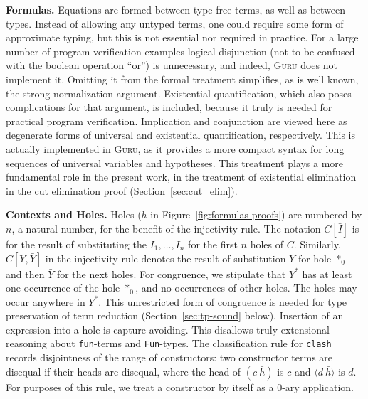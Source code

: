 \documentclass{fundam}
\begin{document}
\textbf{Formulas.} Equations are formed between type-free terms, as
well as between types.  Instead of allowing any untyped terms, one
could require some form of approximate typing, but this is not
essential nor required in practice.  For a large number of program
verification examples logical disjunction (not to be confused with the
boolean operation ``or'') is unnecessary, and indeed, \textsc{Guru}
does not implement it.  Omitting it from the formal treatment
simplifies, as is well known, the strong normalization argument.
Existential quantification, which also poses complications for that
argument, is included, because it truly is needed for practical
program verification.  Implication and conjunction are viewed here as
degenerate forms of universal and existential quantification,
respectively.  This is actually implemented in \textsc{Guru}, as it
provides a more compact syntax for long sequences of universal
variables and hypotheses.  This treatment plays a more fundamental
role in the present work, in the treatment of existential elimination
in the cut elimination proof (Section~\ref{sec:cut_elim}).

\textbf{Contexts and Holes.}  Holes ($h$ in
Figure~\ref{fig:formulas-proofs}) are numbered by $n$, a natural
number, for the benefit of the injectivity rule.  The notation
$C[\bar{I}]$ is for the result of substituting the $I_1,\ldots,I_n$
for the first $n$ holes of $C$.  Similarly, $C[Y,\bar{Y}]$ in the
injectivity rule denotes the result of substitution $Y$ for hole $*_0$
and then $\bar{Y}$ for the next holes.  For congruence, we stipulate
that $Y^*$ has at least one occurrence of the hole $*_0$, and no
occurrences of other holes.  The holes may occur anywhere in $Y^*$.
This unrestricted form of congruence is needed for type preservation
of term reduction (Section~\ref{sec:tp-sound} below). Insertion of an
expression into a hole is capture-avoiding.  This disallows truly
extensional reasoning about \texttt{fun}-terms and \texttt{Fun}-types.
The classification rule for \texttt{clash} records disjointness of the
range of constructors: two constructor terms are disequal if their
heads are disequal, where the head of $(c\ \bar{h})$ is $c$ and
$\langle d\ \bar{h}\rangle$ is $d$.  For purposes of this rule, we
treat a constructor by itself as a 0-ary application.
\end{document}
